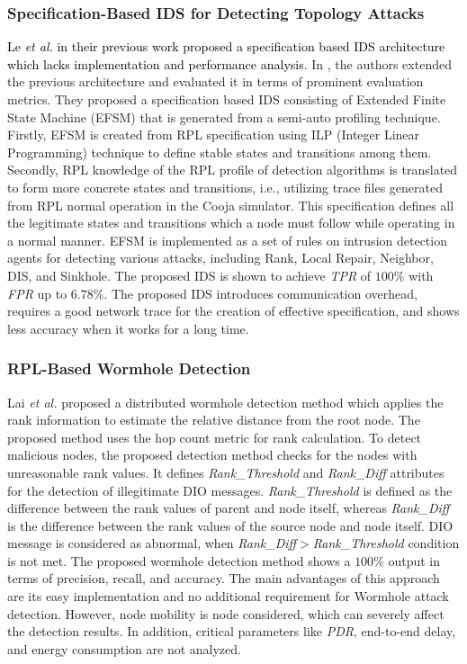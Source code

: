 \documentclass[10pt,journal,sort & compress]{IEEEtran}
\begin{document}
\subsubsection*{Specification-Based IDS for Detecting Topology Attacks}
\textcolor{black}{Le \textit{et al.} in their previous work \cite{Le2011} proposed a specification based IDS architecture which lacks implementation and performance analysis.} In \cite{Le2016}, the authors extended the previous architecture and evaluated it in terms of prominent evaluation metrics. They proposed a specification based IDS consisting of Extended Finite State Machine (EFSM) that is generated from a semi-auto profiling technique. Firstly, EFSM is created from RPL specification using ILP (Integer Linear Programming) technique to define stable states and transitions among them. Secondly, RPL knowledge of the RPL profile of detection algorithms is translated to form more concrete states and transitions, i.e., utilizing trace files generated from RPL normal operation in the Cooja simulator. This specification defines all the legitimate states and transitions which a node must follow while operating in a normal manner. EFSM is implemented as a set of rules on intrusion detection agents for detecting various attacks, including Rank, Local Repair, Neighbor, DIS, and Sinkhole. The proposed IDS is shown to achieve \textit{TPR} of $ 100\% $ with \textit{FPR} up to $ 6.78\% $. The proposed IDS introduces communication overhead, requires a good network trace for the creation of effective specification, and shows less accuracy when it works for a long time. 

\subsubsection*{RPL-Based Wormhole Detection}
Lai \textit{et al.} \cite{lai2016detection} proposed a distributed wormhole detection method which applies the rank information to estimate the relative distance from the root node. The proposed method uses the hop count metric for rank calculation. To detect malicious nodes, the proposed detection method checks for the nodes with unreasonable rank values. It defines \textit{Rank\_Threshold} and \textit{Rank\_Diff} attributes for the detection of illegitimate DIO messages. \textit{Rank\_Threshold} is defined as the difference between the rank values of parent and node itself, whereas \textit{Rank\_Diff} is the difference between the rank values of the source node and node itself. DIO message is considered as abnormal, when \textit{Rank\_Diff}$ > $\textit{Rank\_Threshold} condition is not met. The proposed wormhole detection method shows a $ 100\% $ output in terms of precision, recall, and accuracy. The main advantages of this approach are its easy implementation and no additional requirement for Wormhole attack detection. However, node mobility is node considered, which can severely affect the detection results. In addition, critical parameters like \textit{PDR}, end-to-end delay, and energy consumption are not analyzed.
\end{document}
